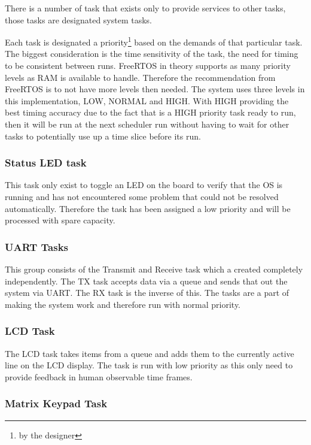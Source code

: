 \documentclass[../../../main]{subfiles}
\begin{document}
There is a number of task that exists only to provide services to other tasks, those tasks are designated system tasks. 

Each task is designated a priority\footnote{by the designer} based on the demands of that particular task. The biggest consideration is the time sensitivity of the task, the need for timing to be consistent between runs. FreeRTOS in theory supports as many priority levels as RAM is available to handle. Therefore the recommendation from FreeRTOS is to not have more levels then needed. The system uses three levels in this implementation, LOW, NORMAL and HIGH. With HIGH providing the best timing accuracy due to the fact that is a HIGH priority task  ready to run, then it will be run at the next scheduler run without having to wait for other tasks to potentially use up a time slice before its run.


\subsubsection{Status LED task}

This task only exist to toggle an LED on the board to verify that the OS is running and has not encountered some problem that could not be resolved automatically. Therefore the task has been assigned a low priority and will be processed with spare capacity.

\subsubsection{UART Tasks}%

This group consists of the Transmit and Receive task which a created completely independently. The TX task accepts data via a queue and sends that out the system via UART. The RX task is the inverse of this. The tasks are a part of making the system work and therefore run with normal priority. 


\subsubsection{LCD Task}

The LCD task takes items from a queue and adds them to the currently active line on the LCD display. The task is run with low priority as this only need to provide feedback in human observable time frames.

\subsubsection{Matrix Keypad Task}
\end{document}
